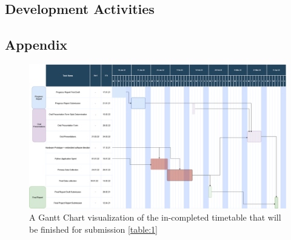 \documentclass[11pt,letterpaper]{article}
\begin{document}
\newpage
\begin{flushleft}
\justifying






\section{Development Activities}


















\end{flushleft}
\begin{landscape}

\section*{Appendix}
\begin{figure}[htbp]
\centering
\includegraphics[scale=0.25]{Progress_Report/figs/progressreportGantt-Page-1.drawio(1).png}
\caption{A Gantt Chart visualization of the in-completed timetable that will be finished for submission \ref{table:1}}
\label{fig:Appendix}
\end{figure}
\end{landscape}
\end{document}
